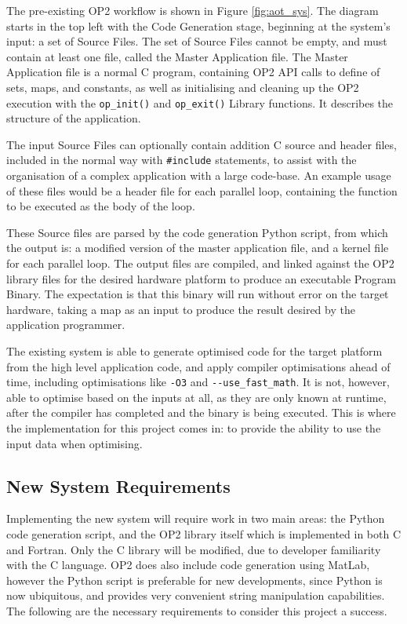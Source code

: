 The pre-existing OP2 workflow is shown in Figure \ref{fig:aot_sys}. The diagram starts in the top left with the Code Generation stage, beginning at the system's input: a set of Source Files. The set of Source Files cannot be empty, and must contain at least one file, called the Master Application file. The Master Application file is a normal C program, containing OP2 API calls to define of sets, maps, and constants, as well as initialising and cleaning up the OP2 execution with the \verb|op_init()| and \verb|op_exit()| Library functions. It describes the structure of the application.
\par
The input Source Files can optionally contain addition C source and header files, included in the normal way with \verb|#include| statements, to assist with the organisation of a complex application with a large code-base. An example usage of these files would be a header file for each parallel loop, containing the function to be executed as the body of the loop.
\par
These Source files are parsed by the code generation Python script, from which the output is: a modified version of the master application file, and a kernel file for each parallel loop. The output files are compiled, and linked against the OP2 library files for the desired hardware platform to produce an executable Program Binary. The expectation is that this binary will run without error on the target hardware, taking a map as an input to produce the result desired by the application programmer.
\par
The existing system is able to generate optimised code for the target platform from the high level application code, and apply compiler optimisations ahead of time, including optimisations like \verb|-O3| and \verb|--use_fast_math|. It is not, however, able to optimise based on the inputs at all, as they are only known at runtime, after the compiler has completed and the binary is being executed. This is where the implementation for this project comes in: to provide the ability to use the input data when optimising.

\subsection{New System Requirements}
\label{ss:reqs}

Implementing the new system will require work in two main areas: the Python code generation script, and the OP2 library itself which is implemented in both C and Fortran. Only the C library will be modified, due to developer familiarity with the C language. OP2 does also include code generation using MatLab, however the Python script is preferable for new developments, since Python is now ubiquitous, and provides very convenient string manipulation capabilities. The following are the necessary requirements to consider this project a success.


